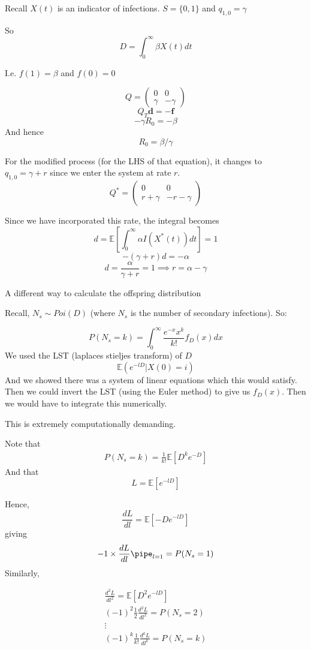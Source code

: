 \documentclass{/home/janmebows/Documents/LatexTemplates/myassignment}
\begin{document}
Recall $X(t)$ is an indicator of infections. $S = \{0,1\}$ and $q_{1,0} = \gamma$

So 
\[D = \int_0^\infty \beta X(t) dt\]

I.e. $f(1) = \beta$ and $f(0) = 0$

\[Q = \begin{pmatrix}
    0&0\\ \gamma & -\gamma
\end{pmatrix}\]
\[Q_T \mathbf{d} = - \mathbf{f}\]
\[-\gamma R_0 = -\beta\]
And hence
\[R_0 = \beta/\gamma\]

For the modified process (for the LHS of that equation), it changes to $q_{1,0} = \gamma + r$ since we enter the system at rate $r$.
\[Q^* = \begin{pmatrix}
    0&0\\r + \gamma & - r- \gamma
\end{pmatrix}\]

Since we have incorporated this rate, the integral becomes 
\[d=\mathbb{E}\left[\int_0^\infty \alpha I(X^*(t)) dt\right]=1\]
\[-(\gamma + r)d = -\alpha\]
\[d = \frac{\alpha}{\gamma+r} = 1 \implies r = \alpha- \gamma\]


A different way to calculate the offspring distribution

Recall, $N_s \sim Poi(D)$ (where $N_s$ is the number of secondary infections). So:

\[P(N_s = k) = \int_0^\infty\frac{e^{-x}x^k}{k!} f_D(x) dx\]
We used the LST (laplaces stieljes transform) of $D$
\[\mathbb{E}(e^{-lD} | X(0) = i)\]
And we showed there was a system of linear equations which this would satisfy.
Then we could invert the LST (using the Euler method) to give us $f_D(x)$.
Then we would have to integrate this numerically.

This is extremely computationally demanding.



Note that 
\begin{align*}
  P(N_s =k) = \frac1{k!} \mathbb{E}\left[D^k e^{-D}\right]
\end{align*}
And that 
\[L = \mathbb{E}\left[e^{-lD}\right]\]

Hence,
\[\frac{dL}{dl} = \mathbb{E}\left[-De^{-lD}\right]\]
giving
\[-1 \times \frac{dL}{dl} \pipe_{l=1} = P(N_s=1)\]
Similarly,

\begin{align*}
    \frac{d^2L}{dl^2} = \mathbb{E}\left[D^2 e^{-lD}\right]\\
    (-1)^2\frac12 \frac{d^2 L }{dl^2} = P(N_s=2)\\
    \vdots\\
    (-1)^k \frac{1}{k!} \frac{d^kL}{dl^k} = P(N_s=k)    
\end{align*}
\end{document}
